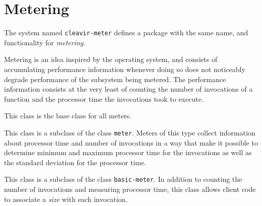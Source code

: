 \chapter{Metering}

The system named \texttt{cleavir-meter} defines a package with the
same name, and functionality for \emph{metering}. 

Metering is an idea inspired by the \multics{} operating system, and
consists of accumulating performance information whenever doing so
does not noticeably degrade performance of the subsystem being
metered.  The performance information consists at the very least of
counting the number of invocations of a function and the processor
time the invocations took to execute.


This class is the base class for all meters.


This class is a subclass of the class \texttt{meter}.  Meters of this
type collect information about processor time and number of
invocations in a way that make it possible to determine minimum and
maximum processor time for the invocations as well as the standard
deviation for the processor time.


This class is a subclass of the class \texttt{basic-meter}.  In
addition to counting the number of invocations and measuring processor
time, this class allows client code to associate a \emph{size} with
each invocation.
